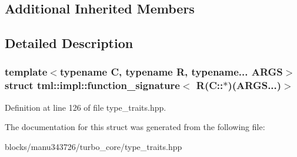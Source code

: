 \subsection*{Additional Inherited Members}


\subsection{Detailed Description}
\subsubsection*{template$<$typename C, typename R, typename... A\+R\+G\+S$>$struct tml\+::impl\+::function\+\_\+signature$<$ R(\+C\+::$\ast$)(\+A\+R\+G\+S...)$>$}



Definition at line 126 of file type\+\_\+traits.\+hpp.



The documentation for this struct was generated from the following file\+:\begin{DoxyCompactItemize}
\item 
blocks/manu343726/turbo\+\_\+core/type\+\_\+traits.\+hpp\end{DoxyCompactItemize}
